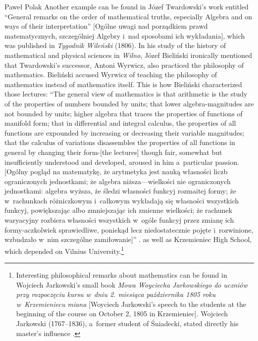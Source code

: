 \begin{artengenv}{Paweł Polak}
{ Another example can be found in Józef Twardowski's work entitled ``General remarks on the order of mathematical truths, especially Algebra and on ways of their interpretation'' [Ogólne uwagi nad porządkiem prawd matematycznych, szczególniej Algebry i~nad sposobami ich wykładania], which was published in \textit{Tygodnik Wileński} (1806). In his study of the history of mathematical and physical sciences in \textit{Wilno}, Józef Bieliński ironically mentioned that Twardowski's successor, Antoni Wyrwicz, also practiced the philosophy of mathematics. Bieliński accused Wyrwicz of teaching the philosophy of mathematics instead of mathematics itself. This is how Bieliński characterized those lectures: ``The general view of mathematics is that arithmetic is the study of the properties of numbers bounded by units; that lower algebra-magnitudes are not bounded by units; higher algebra that traces the properties of functions of manifold form; that in differential and integral calculus, the properties of all functions are expounded by increasing or decreasing their variable magnitudes; that the calculus of variations disassembles the properties of all functions in general by changing their form-[the lectures] though fair, somewhat but insufficiently understood and developed, aroused in him a~particular passion. [Ogólny pogląd na matematykę, że arytmetyka jest nauką własności liczb ograniczonych jednostkami; że algebra niższa---wielkości nie ograniczonych jednostkami: algebra wyższa, że śledzi własności funkcyj rozmaitej formy; że w~rachunkach różniczkowym i~całkowym wykładają się własności wszystkich funkcyj, powiększając albo zmniejszając ich zmienne wielkości; że rachunek waryacyjny rozbiera własności wszystkich w~ogóle funkcyj przez zmianę ich formy-aczkolwiek sprawiedliwe, poniekąd lecz niedostatecznie pojęte i~rozwinione, wzbudzało w~nim szczególne zamiłowanie]'' 
\mbox{\parencite[][pp.21–22]{bielinski_stan_1890}}.%
} as well as Krzemieniec High School, which depended on Vilnius University.\footnote{Interesting philosophical remarks about mathematics can be found in Wojciech Jarkowski's small book \textit{Mowa Woyciecha Jarkowskiego do uczniów przy rozpoczęciu kursu w~dniu 2. miesiąca października 1805 roku w~Krzemieniecu miana} [Woyciech Jarkowski's speech to the students at the beginning of the course on October 2, 1805 in Krzemieniec]. Wojciech Jarkowski (1767--1836), a~former student of Śniadecki, stated directly his master's influence 
\parencite[][p.9]{jarkowski_mowa_1805}. %
}
\end{artengenv}

